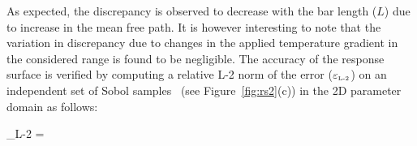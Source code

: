As expected, the discrepancy is observed to decrease
 with the bar length ($L$) due to increase in the mean free path. It is however interesting to note that the 
 variation in discrepancy due to changes in the applied temperature gradient in the considered range is found to be
 negligible. The accuracy of the response surface is verified by computing a relative L-2 norm of the error
 ($\varepsilon_{\tiny{\mbox{L-2}}}$) on an independent set of Sobol samples~\cite{Saltelli:2010}
(see Figure~\ref{fig:rs2}(c)) in the 2D 
 parameter domain as follows:
 
 \be
 \varepsilon_{\tiny{\mbox{L-2}}} =  
 \label{eq:err_l2}
 \ee
 
